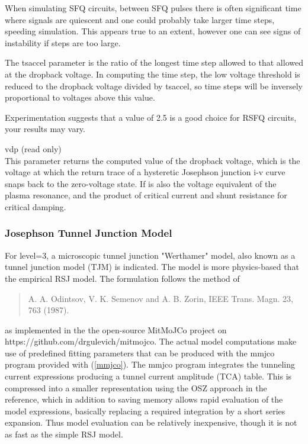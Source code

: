 \begin{description}
When simulating SFQ circuits, between SFQ pulses there is often
significant time where signals are quiescent and one could probably
take larger time steps, speeding simulation.  This appears true to an
extent, however one can see signs of instability if steps are too
large.

The {\vt tsaccel} parameter is the ratio of the longest time step
allowed to that allowed at the dropback voltage.  In computing the
time step, the low voltage threshold is reduced to the dropback
voltage divided by {\vt tsaccel}, so time steps will be inversely
proportional to voltages above this value.

Experimentation suggests that a value of 2.5 is a good choice for RSFQ
circuits, your results may vary.

\item{\vt vdp} (read only)\\
This parameter returns the computed value of the dropback voltage,
which is the voltage at which the return trace of a hysteretic
Josephson junction i-v curve snaps back to the zero-voltage state.  If
is also the voltage equivalent of the plasma resonance, and the
product of critical current and shunt resistance for critical damping.
\end{description}


\subsubsection{Josephson Tunnel Junction Model}
\label{tjmodel}


For {\vt level=3}, a microscopic tunnel junction "Werthamer" model,
also known as a tunnel junction model (TJM) is indicated.  The model
is more physics-based that the empirical RSJ model.  The formulation
follows the method of
\begin{quote}
A. A. Odintsov, V. K. Semenov and A. B. Zorin, IEEE Trans. Magn. 23,
763 (1987).
\end{quote}
as implemented in the the open-source MitMoJCo project on {\vt
https://github.com/drgulevich/mitmojco}.  The actual model
computations make use of predefined fitting parameters that can be
produced with the {\vt mmjco} program provided with {\WRspice}
(\ref{mmjco}).  The {\vt mmjco} program integrates the tunneling
current expressions producing a tunnel current amplitude (TCA) table. 
This is compressed into a smaller representation using the OSZ
approach in the reference, which in addition to saving memory allows
rapid evaluation of the model expressions, basically replacing a
required integration by a short series expansion.  Thus model
evaluation can be relatively inexpensive, though it is not as fast as
the simple RSJ model.

